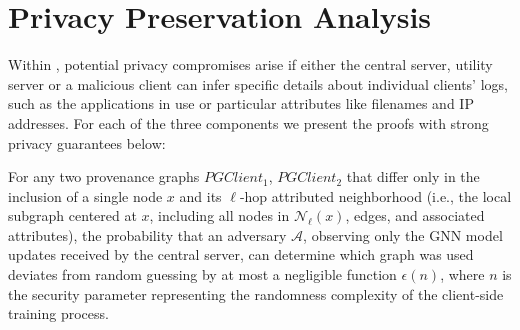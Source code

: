 \section{Privacy Preservation Analysis}
\label{sec:privacy}

Within \Sys, potential privacy compromises arise if either the central server, utility server or a malicious client can infer specific details about individual clients' logs, such as the applications in use or particular attributes like filenames and IP addresses. For each of the three components we present the proofs with strong privacy guarantees below:

\renewcommand{\thetheorem}{\arabic{theorem}}

\begin{theorem}
    For any two provenance graphs \(PGClient_1\), \(PGClient_2\) that differ only in the inclusion of a single node \(x\) and its \(\ell\)-hop attributed neighborhood (i.e., the local subgraph centered at \(x\), including all nodes in \(\mathcal{N}_\ell(x)\), edges, and associated attributes), the probability that an adversary \(\mathcal{A}\), observing only the GNN model updates received by the central server, can determine which graph was used deviates from random guessing by at most a negligible function \(\epsilon(n)\), where \(n\) is the security parameter representing the randomness complexity of the client-side training process.
    \end{theorem}
    
